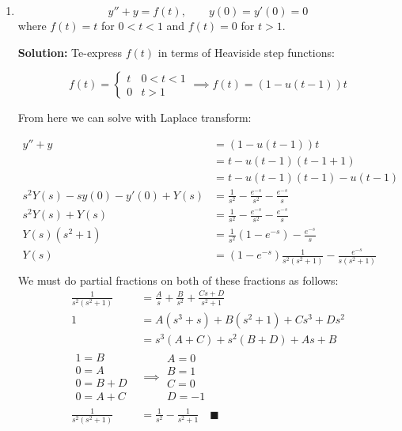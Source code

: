 \documentclass[letterpaper, fontsize=11pt]{scrartcl} %
\numberwithin{equation}{section} %
\numberwithin{figure}{section} %
\numberwithin{table}{section} %
\begin{document}
\begin{enumerate}
\begin{enumerate}
\item $$y'' + y = f(t),\qquad y(0) = y'(0) = 0$$  
where $f(t) = t$ for $0 < t < 1$ and $f(t) = 0$ for $t > 1$. 
\par \textbf{Solution:}\newline
Te-express $f(t)$ in terms of Heaviside step functions:

\[ 
f(t) = \begin{cases} 
      t & 0 < t < 1 \\
      0 & t > 1 
   \end{cases}
   \implies
   f(t) = (1 - u(t-1))t
\]

From here we can solve with Laplace transform:

\begin{align*}
y'' + y &= (1-u(t-1))t\\
&= t- u(t-1)(t-1 + 1)\\
&= t- u(t-1)(t-1) -u(t-1)\\
s^2Y(s)  - sy(0) - y'(0) + Y(s) &= \frac{1}{s^2} - \frac{e^{-s}}{s^2} - \frac{e^{-s}}{s}\\
s^2Y(s) + Y(s) &= \frac{1}{s^2} - \frac{e^{-s}}{s^2} - \frac{e^{-s}}{s} \\
Y(s)\left(s^2 + 1 \right) &=  \frac{1}{s^2}\left(1 - e^{-s}\right) - \frac{e^{-s}}{s}  \\
Y(s) &= \left(1 - e^{-s} \right)\frac{1}{s^2(s^2 + 1)} - \frac{e^{-s}}{s(s^2 + 1)}\\
\end{align*}
We must do partial fractions on both of these fractions as follows:
\begin{align*}
\frac{1}{s^2(s^2 + 1)} &= \frac{A}{s} + \frac{B}{s^2} + \frac{Cs + D}{s^2 + 1}\\
1&= A(s^3 + s) + B(s^2+1) + Cs^3 + Ds^2\\
&= s^3(A + C) + s^2(B + D) + As + B\\
\begin{array}{c}
1 = B \\
0 = A \\
0 = B+D\\
0 = A + C
\end{array}
&\implies
\begin{array}{c}
A = 0 \\
B = 1 \\
C = 0 \\ 
D = -1
\end{array} \\
\frac{1}{s^2(s^2 + 1)} &= \frac{1}{s^2} - \frac{1}{s^2 + 1} \quad \blacksquare\\

\end{align*}
\end{enumerate}
\end{enumerate}
\end{document}

